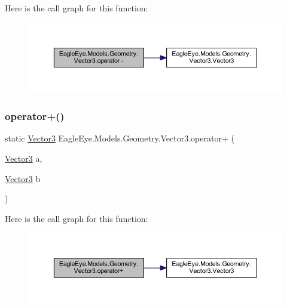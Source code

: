 Here is the call graph for this function\+:\nopagebreak
\begin{figure}[H]
\begin{center}
\leavevmode
\includegraphics[width=350pt]{struct_eagle_eye_1_1_models_1_1_geometry_1_1_vector3_ae13e288358da8512159f0d6678e4bc12_cgraph}
\end{center}
\end{figure}
\mbox{\label{struct_eagle_eye_1_1_models_1_1_geometry_1_1_vector3_ae1a94475d906e5083c5b8e1b6bcd32c6}} 
\subsubsection{\texorpdfstring{operator+()}{operator+()}}
{\footnotesize\ttfamily static \mbox{\hyperlink{struct_eagle_eye_1_1_models_1_1_geometry_1_1_vector3}{Vector3}} Eagle\+Eye.\+Models.\+Geometry.\+Vector3.\+operator+ (\begin{DoxyParamCaption}\item[{\mbox{\hyperlink{struct_eagle_eye_1_1_models_1_1_geometry_1_1_vector3}{Vector3}}}]{a,  }\item[{\mbox{\hyperlink{struct_eagle_eye_1_1_models_1_1_geometry_1_1_vector3}{Vector3}}}]{b }\end{DoxyParamCaption})\hspace{0.3cm}{\ttfamily [static]}}

Here is the call graph for this function\+:\nopagebreak
\begin{figure}[H]
\begin{center}
\leavevmode
\includegraphics[width=350pt]{struct_eagle_eye_1_1_models_1_1_geometry_1_1_vector3_ae1a94475d906e5083c5b8e1b6bcd32c6_cgraph}
\end{center}
\end{figure}
\mbox{\label{struct_eagle_eye_1_1_models_1_1_geometry_1_1_vector3_a9b7fedd733eb64cd5767e25210de0d38}} 
